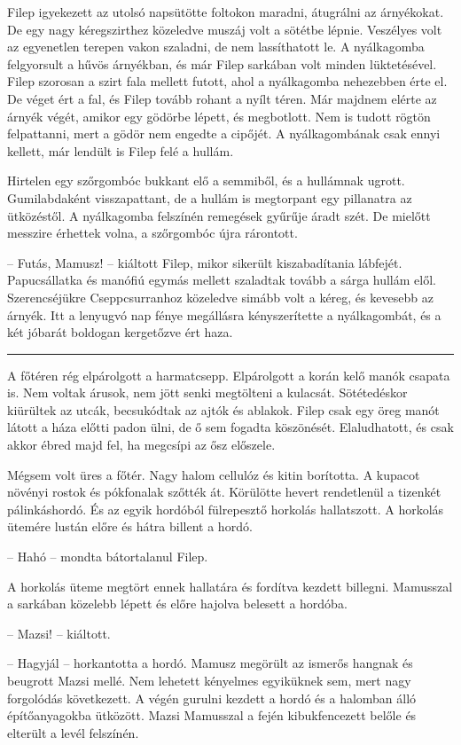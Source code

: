 \documentclass[10pt]{memoir}
\renewcommand{\pfbreakdisplay}{\bigskip \ding{166} \bigskip}
\newcommand{\secbreak}{\fancybreak{\pfbreakdisplay}\indent}
\begin{document}
Filep igyekezett az utolsó napsütötte foltokon maradni, átugrálni az
árnyékokat. De egy nagy kéregszirthez közeledve muszáj volt a sötétbe lépnie.
Veszélyes volt az egyenetlen terepen vakon szaladni, de nem lassíthatott le. A
nyálkagomba felgyorsult a hűvös árnyékban, és már Filep sarkában volt minden
lüktetésével. Filep szorosan a szirt fala mellett futott, ahol a nyálkagomba
nehezebben érte el. De véget ért a fal, és Filep tovább rohant a nyílt téren.
Már majdnem elérte az árnyék végét, amikor egy gödörbe lépett, és megbotlott.
Nem is tudott rögtön felpattanni, mert a gödör nem engedte a cipőjét. A
nyálkagombának csak ennyi kellett, már lendült is Filep felé a hullám.

Hirtelen egy szőrgombóc bukkant elő a semmiből, és a hullámnak ugrott.
Gumilabdaként visszapattant, de a hullám is megtorpant egy pillanatra az
ütközéstől. A nyálkagomba felszínén remegések gyűrűje áradt szét. De mielőtt
messzire érhettek volna, a szőrgombóc újra rárontott.

-- Futás, Mamusz! -- kiáltott Filep, mikor sikerült kiszabadítania lábfejét.
Papucsállatka és manófiú egymás mellett szaladtak tovább a sárga hullám elől.
Szerencséjükre Cseppcsurranhoz közeledve simább volt a kéreg, és kevesebb az
árnyék. Itt a lenyugvó nap fénye megállásra kényszerítette a nyálkagombát, és a
két jóbarát boldogan kergetőzve ért haza.

\secbreak

A főtéren rég elpárolgott a harmatcsepp. Elpárolgott a korán kelő manók csapata
is. Nem voltak árusok, nem jött senki megtölteni a kulacsát. Sötétedéskor
kiürültek az utcák, becsukódtak az ajtók és ablakok. Filep csak egy öreg manót
látott a háza előtti padon ülni, de ő sem fogadta köszönését. Elaludhatott, és
csak akkor ébred majd fel, ha megcsípi az ősz előszele.

Mégsem volt üres a főtér. Nagy halom cellulóz és kitin borította. A kupacot
növényi rostok és pókfonalak szőtték át. Körülötte hevert rendetlenül a
tizenkét pálinkáshordó. És az egyik hordóból fülrepesztő horkolás hallatszott.
A horkolás ütemére lustán előre és hátra billent a hordó.

-- Hahó -- mondta bátortalanul Filep.

A horkolás üteme megtört ennek hallatára és fordítva kezdett billegni.
Mamusszal a sarkában közelebb lépett és előre hajolva belesett a hordóba.

-- Mazsi! -- kiáltott.

-- Hagyjál -- horkantotta a hordó. Mamusz megörült az ismerős hangnak és
beugrott Mazsi mellé. Nem lehetett kényelmes egyiküknek sem, mert nagy
forgolódás következett. A végén gurulni kezdett a hordó és a halomban álló
építőanyagokba ütközött. Mazsi Mamusszal a fején kibukfencezett belőle és
elterült a levél felszínén.
\end{document}
